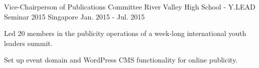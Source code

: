 \begin{cventries}
  \cventry
    {Vice-Chairperson of Publications Committee} %
    {River Valley High School - Y.LEAD Seminar 2015} %
    {Singapore} %
    {Jan. 2015 - Jul. 2015} %
    {
      \begin{cvitems} %
        \item {Led 20 members in the publicity operations of a week-long international youth leaders summit.}
        \item {Set up event domain and WordPress CMS functionality for online publicity.}
      \end{cvitems}
    }



\end{cventries}
